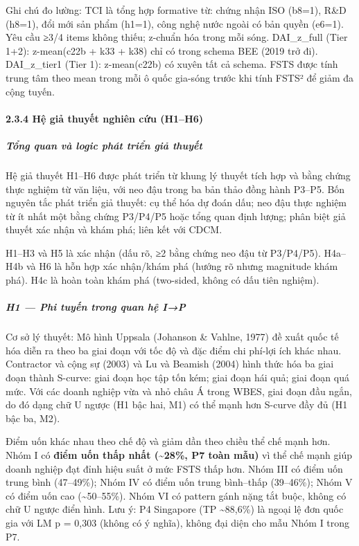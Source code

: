 \documentclass[12pt,a4paper]{article}
\begin{document}
Ghi chú đo lường: TCI là tổng hợp formative từ: chứng nhận ISO (b8=1),
R\&D (h8=1), đổi mới sản phẩm (h1=1), công nghệ nước ngoài có bản quyền
(e6=1). Yêu cầu ≥3/4 items không thiếu; z-chuẩn hóa trong mỗi sóng.
DAI\_z\_full (Tier 1+2): z-mean(c22b + k33 + k38) chỉ có trong schema
BEE (2019 trở đi). DAI\_z\_tier1 (Tier 1): z-mean(c22b) có xuyên tất cả
schema. FSTS được tính trung tâm theo mean trong mỗi ô quốc gia-sóng
trước khi tính FSTS² để giảm đa cộng tuyến.

\hypertarget{234-hux1ec7-giux1ea3-thuyux1ebft-nghiuxean-cux1ee9u-h1h6}{%
\paragraph{2.3.4 Hệ giả thuyết nghiên cứu
(H1--H6)}\label{234-hux1ec7-giux1ea3-thuyux1ebft-nghiuxean-cux1ee9u-h1h6}}

\hypertarget{tux1ed5ng-quan-vuxe0-logic-phuxe1t-triux1ec3n-giux1ea3-thuyux1ebft}{%
\subparagraph{Tổng quan và logic phát triển giả
thuyết}\label{tux1ed5ng-quan-vuxe0-logic-phuxe1t-triux1ec3n-giux1ea3-thuyux1ebft}}

Hệ giả thuyết H1--H6 được phát triển từ khung lý thuyết tích hợp và bằng
chứng thực nghiệm từ văn liệu, với neo đậu trong ba bản thảo đồng hành
P3--P5. Bốn nguyên tắc phát triển giả thuyết: cụ thể hóa dự đoán dấu;
neo đậu thực nghiệm từ ít nhất một bằng chứng P3/P4/P5 hoặc tổng quan
định lượng; phân biệt giả thuyết xác nhận và khám phá; liên kết với
CDCM.

H1--H3 và H5 là xác nhận (dấu rõ, ≥2 bằng chứng neo đậu từ P3/P4/P5).
H4a--H4b và H6 là hỗn hợp xác nhận/khám phá (hướng rõ nhưng magnitude
khám phá). H4c là hoàn toàn khám phá (two-sided, không có dấu tiên
nghiệm).

\hypertarget{h1--phi-tuyux1ebfn-trong-quan-hux1ec7-ip}{%
\subparagraph{H1 --- Phi tuyến trong quan hệ
I→P}\label{h1--phi-tuyux1ebfn-trong-quan-hux1ec7-ip}}

Cơ sở lý thuyết: Mô hình Uppsala (Johanson \& Vahlne, 1977) đề xuất quốc
tế hóa diễn ra theo ba giai đoạn với tốc độ và đặc điểm chi phí-lợi ích
khác nhau. Contractor và cộng sự (2003) và Lu và Beamish (2004) hình
thức hóa ba giai đoạn thành S-curve: giai đoạn học tập tốn kém; giai
đoạn hái quả; giai đoạn quá mức. Với các doanh nghiệp vừa và nhỏ châu Á
trong WBES, giai đoạn đầu ngắn, do đó dạng chữ U ngược (H1 bậc hai, M1)
có thể mạnh hơn S-curve đầy đủ (H1 bậc ba, M2).

Điểm uốn khác nhau theo chế độ và giảm dần theo chiều thể chế mạnh hơn.
Nhóm I có \textbf{điểm uốn thấp nhất (\textasciitilde28\%, P7 toàn mẫu)}
vì thể chế mạnh giúp doanh nghiệp đạt đỉnh hiệu suất ở mức FSTS thấp
hơn. Nhóm III có điểm uốn trung bình (47--49\%); Nhóm IV có điểm uốn
trung bình--thấp (39--46\%); Nhóm V có điểm uốn cao
(\textasciitilde50--55\%). Nhóm VI có pattern gánh nặng tắt buộc, không
có chữ U ngược điển hình. Lưu ý: P4 Singapore (TP \textasciitilde88,6\%)
là ngoại lệ đơn quốc gia với LM p = 0,303 (không có ý nghĩa), không đại
diện cho mẫu Nhóm I trong P7.
\end{document}
